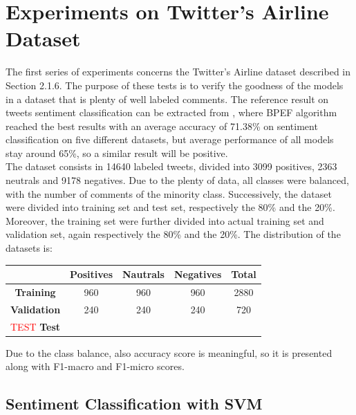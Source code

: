 \section{Experiments on Twitter's Airline Dataset}

The first series of experiments concerns the Twitter's Airline dataset described in Section 2.1.6. The purpose of these tests is to verify the goodness of the models in a dataset that is plenty of well labeled comments. The reference result on tweets sentiment classification can be extracted from \cite{Zimbra:2018:STS:3210372.3185045}, where BPEF algorithm reached the best results with an average accuracy of 71.38\% on sentiment classification on five different datasets, but average performance of all models stay around 65\%, so a similar result will be positive.\\
The dataset consists in 14640 labeled tweets, divided into 3099 positives, 2363 neutrals and 9178 negatives. Due to the plenty of data, all classes were balanced, with the number of comments of the minority class. Successively, the dataset were divided into training set and test set, respectively the 80\% and the 20\%. Moreover, the training set were further divided into actual training set and validation set, again respectively the 80\% and the 20\%. The distribution of the datasets is:

\begin{center}
	\begin{tabular}{ | c  c  c  c | c | } 
		\hline
		& \textbf{Positives} & \textbf{Nautrals} & \textbf{Negatives} & \textbf{Total} \\
		\hline
		\textbf{Training} & 960 & 960 & 960 & 2880 \\ 
		\hline
		\textbf{Validation} & 240 & 240 & 240 & 720 \\ 
		\hline
		\textcolor{red}{TEST}
		\textbf{Test} &  &  & &\\
		\hline
	\end{tabular}
\end{center}

Due to the class balance, also accuracy score is meaningful, so it is presented along with F1-macro and F1-micro scores.


\subsection{Sentiment Classification with SVM}

